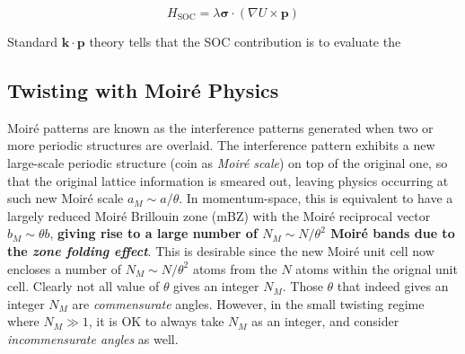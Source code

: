 \begin{equation}
    H_{\text{SOC}}=\lambda\bm\sigma\cdot(\nabla U\times\bm p)
\end{equation}

Standard $\bm k\cdot\bm p$ theory tells that the SOC contribution is to evaluate the







\subsection{Twisting with Moir\'{e} Physics}
Moir\'e patterns are known as the interference patterns generated when two or more periodic structures are overlaid. The interference pattern exhibits a new large-scale periodic structure (coin as \emph{Moir\'{e} scale}) on top of the original one, so that the original lattice information is smeared out, leaving physics occurring at such new Moir\'{e} scale $a_M\sim a/\theta$. In momentum-space, this is equivalent to have a largely reduced Moir\'e Brillouin zone (mBZ) with the Moir\'e reciprocal vector $b_M\sim \theta b$, \textbf{giving rise to a large number of $N_M\sim N/\theta^2$ Moir\'e bands due to the \emph{zone folding effect}}. This is desirable since the new Moir\'e unit cell now encloses a number of $N_M\sim N/\theta^2$ atoms from the $N$ atoms within the orignal unit cell. Clearly not all value of $\theta$ gives an integer $N_M$. Those $\theta$ that indeed gives an integer $N_M$ are \emph{commensurate} angles. However, in the small twisting regime where $N_M\gg1$, it is OK to always take $N_M$ as an integer, and consider \emph{incommensurate angles} as well.

